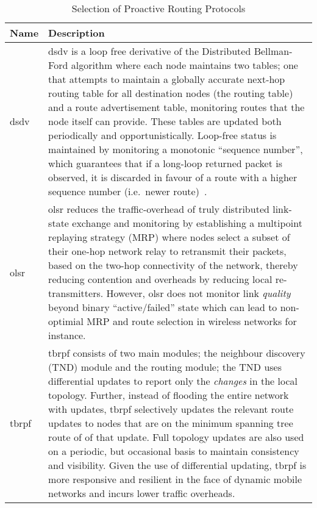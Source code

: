 \begin{table}\centering
  \caption[Selection of Proactive Routing Protocols]{Selection of Proactive Routing Protocols}
  \label{tab:proactive_routing_protocols}
  \begin{tabularx}{\textwidth}{p{1.25cm}|X}\toprule
    Name & Description \\ \midrule
    \gls{dsdv} & \acrlong{dsdv} is a loop free derivative of the Distributed Bellman-Ford algorithm where each node maintains two tables; one that attempts to maintain a globally accurate next-hop routing table for all destination nodes (the routing table) and a route advertisement table, monitoring routes that the node itself can provide. These tables are updated both periodically and opportunistically. Loop-free status is maintained by monitoring a monotonic ``sequence number'', which guarantees that if a long-loop returned packet is observed, it is discarded in favour of a route with a higher sequence number (i.e.\ newer route)~\cite{Perkins1994}.\\
    \gls{olsr} & \acrlong{olsr} reduces the traffic-overhead of truly distributed link-state exchange and monitoring by establishing a multipoint replaying strategy (MRP) where nodes select a subset of their one-hop network relay to retransmit their packets, based on the two-hop connectivity of the network, thereby reducing contention and overheads by reducing local re-transmitters. However, \gls{olsr} does not monitor link \emph{quality} beyond binary ``active/failed'' state which can lead to non-optimial MRP and route selection in wireless networks for instance.\\
    \gls{tbrpf} & \acrlong{tbrpf} consists of two main modules; the neighbour discovery (TND) module and the routing module; the TND uses differential updates to report only the \emph{changes} in the local topology. Further, instead of flooding the entire network with updates, \gls{tbrpf} selectively updates the relevant route updates to nodes that are on the minimum spanning tree route of of that update. Full topology updates are also used on a periodic, but occasional basis to maintain consistency and visibility. Given the use of differential updating, \gls{tbrpf} is more responsive and resilient in the face of dynamic mobile networks and incurs lower traffic overheads.\cite{Bellur1999}\\
    \bottomrule
  \end{tabularx}
\end{table}


